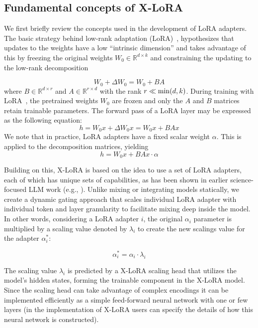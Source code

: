\subsection{Fundamental concepts of X-LoRA}

We first briefly review the concepts used in the development of LoRA adapters. The basic strategy behind low-rank adaptation (LoRA)~\cite{hu2021lora}, hypothesizes that updates to the weights have a low “intrinsic dimension” and takes advantage of this by freezing the original weights $W_0 \in \mathbb{R}^{d \times k}$ and constraining the updating to the low-rank decomposition 
 
\begin{equation}
W_0 + \Delta W_0 = W_0 + BA 
\end{equation}
where $B \in \mathbb{R}^{d \times r}$  and $A \in \mathbb{R}^{r \times d}$ with the rank $r \ll {\rm min}(d,k)$. During training with LoRA~\cite{hu2021lora}, the pretrained weights $W_0$ are frozen and only the $A$ and $B$ matrices retain trainable parameters. The forward pass of a LoRA layer may be expressed as the following equation:
\begin{equation}
    h = W_0x + \Delta W_0x = W_0x + BAx
\end{equation}
We note that in practice, LoRA adapters have a fixed scalar weight $\alpha$. This is applied to the decomposition matrices, yielding
\begin{equation}
    h = W_0x + BAx \cdot \alpha
\end{equation}

Building on this, X-LoRA is based on the idea to use a set of LoRA adapters, each of which has unique sets of capabilities, as has been shown in earlier science-focused LLM work (e.g., \cite{Buehler2023GenerativeDesign}). Unlike mixing or integrating models statically, we create a dynamic gating approach that scales individual LoRA adapter with individual token and layer granularity to facilitate mixing deep inside the model. In other words, considering a LoRA adapter $i$, the original $\alpha_i$ parameter is multiplied by a scaling value denoted by $\lambda_i$ to create the new scalings value for the adapter $\alpha^*_i$:

\begin{equation}
    \alpha^*_i = \alpha_i \cdot \lambda_i
\end{equation}

The scaling value $\lambda_i$ is predicted by a X-LoRA scaling head that utilizes the model's hidden states, forming the trainable component in the X-LoRA model. Since the scaling head can take advantage of complex encodings it can be implemented efficiently as a simple feed-forward neural network with one or few layers (in the implementation of X-LoRA users can specify the details of how this neural network is constructed).

